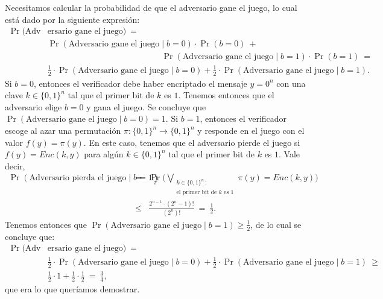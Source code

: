 \documentclass[11pt]{article}
\begin{document}
Necesitamos calcular la probabilidad de que el adversario gane el juego, lo cual está dado por la siguiente expresión:
\begin{align*}
  \Pr(\text{Adv}&\text{ersario gane el juego}) \ =\\
  &\Pr(\text{Adversario gane el juego} \mid b=0) \cdot \Pr(b=0) \ +\\
  &\hspace{162pt} \Pr(\text{Adversario gane el juego} \mid b=1) \cdot \Pr(b=1) \ =\\
  &\frac{1}{2} \cdot \Pr(\text{Adversario gane el juego} \mid b=0) + \frac{1}{2} \cdot \Pr(\text{Adversario gane el juego} \mid b=1).
\end{align*}
Si $b = 0$, entonces el verificador debe haber encriptado el mensaje
$y = 0^n$ con una clave $k \in \{0,1\}^n$ tal que el primer bit de $k$
es $1$. Tenemos entonces que el adversario elige $b = 0$ y gana el
juego. Se concluye que
$  \Pr(\text{Adversario gane el juego} \mid b=0) = 1$.
Si $b = 1$, entonces el verificador escoge al azar una permutación
$\pi : \{0,1\}^n \to \{0,1\}^n$ y responde en el juego con el valor
$f(y) = \pi(y)$. En este caso, tenemos que el adversario pierde el
juego si $f(y) = \textit{Enc}(k,y)$ para algún $k \in \{0,1\}^n$ tal
que el primer bit de $k$ es $1$. Vale decir,
\begin{eqnarray*}
  \Pr(\text{Adversario pierda el juego} \mid b=1) &=&
  \Pr_{\pi}\bigg(\bigvee_{\substack{k \in \{0,1\}^n \,:\\ \text{el primer bit de } k \text{ es } 1}} \pi(y) = \textit{Enc}(k,y)\bigg)\\
  & \leq & \frac{2^{n-1} \cdot (2^n - 1)!}{(2^n)!} \ = \ \frac{1}{2}.
\end{eqnarray*}
Tenemos entonces que $\Pr(\text{Adversario gane el juego} \mid b=1) \geq \frac{1}{2}$, de lo cual se concluye que:
\begin{align*}
  \Pr(\text{Adv}&\text{ersario gane el juego}) \ =\\
  &\frac{1}{2} \cdot \Pr(\text{Adversario gane el juego} \mid b=0) + \frac{1}{2} \cdot \Pr(\text{Adversario gane el juego} \mid b=1) \ \geq\\
  &\frac{1}{2} \cdot 1 + \frac{1}{2} \cdot \frac{1}{2} \ = \ \frac{3}{4},
\end{align*}
que era lo que queríamos demostrar.
\end{document}
